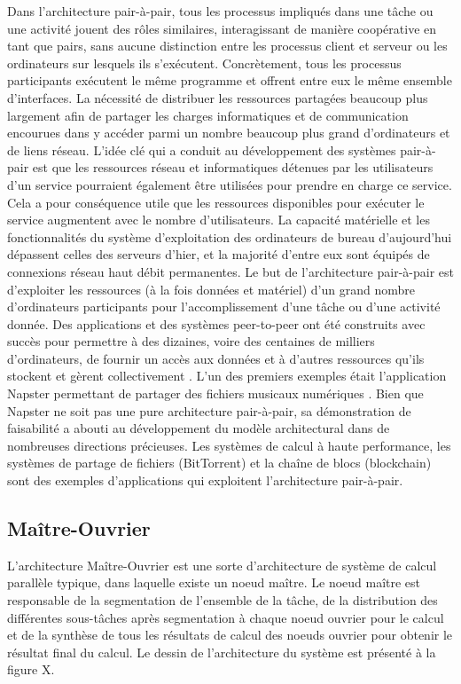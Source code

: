 Dans l'architecture pair-à-pair, tous les processus impliqués dans une tâche ou une activité jouent des rôles similaires, interagissant de manière coopérative en tant que pairs, sans aucune distinction entre les processus client et serveur ou les ordinateurs sur lesquels ils s'exécutent. Concrètement, tous les processus participants exécutent le même programme et offrent entre eux le même ensemble d'interfaces. La nécessité de distribuer les ressources partagées beaucoup plus largement afin de partager les charges informatiques et de communication encourues dans y accéder parmi un nombre beaucoup plus grand d'ordinateurs et de liens réseau. L'idée clé qui a conduit au développement des systèmes pair-à-pair est que les ressources réseau et informatiques détenues par les utilisateurs d'un service pourraient également être utilisées pour prendre en charge ce service. Cela a pour conséquence utile que les ressources disponibles pour exécuter le service augmentent avec le nombre d'utilisateurs. La capacité matérielle et les fonctionnalités du système d'exploitation des ordinateurs de bureau d'aujourd'hui dépassent celles des serveurs d'hier, et la majorité d'entre eux sont équipés de connexions réseau haut débit permanentes. Le but de l'architecture pair-à-pair est d'exploiter les ressources (à la fois données et matériel) d'un grand nombre d'ordinateurs participants pour l'accomplissement d'une tâche ou d'une activité donnée. Des applications et des systèmes peer-to-peer ont été construits avec succès pour permettre à des dizaines, voire des centaines de milliers d'ordinateurs, de fournir un accès aux données et à d'autres ressources qu'ils stockent et gèrent collectivement \cite{Coulouris_2012}. L'un des premiers exemples était l'application Napster permettant de partager des fichiers musicaux numériques \cite{Vu2010}. Bien que Napster ne soit pas une pure architecture pair-à-pair, sa démonstration de faisabilité a abouti au développement du modèle architectural dans de nombreuses directions précieuses. Les systèmes de calcul à haute performance, les systèmes de partage de ﬁchiers (BitTorrent) \cite{toole2006bittorrent} et la chaîne de blocs (blockchain) \cite{Abdella_2021} sont des exemples d'applications qui exploitent l'architecture pair-à-pair.

\subsection{Maître-Ouvrier}

L'architecture Maître-Ouvrier est une sorte d'architecture de système de calcul parallèle typique, dans laquelle existe un noeud maître. Le noeud maître est responsable de la segmentation de l'ensemble de la tâche, de la distribution des différentes sous-tâches après segmentation à chaque noeud ouvrier pour le calcul et de la synthèse de tous les résultats de calcul des noeuds ouvrier pour obtenir le résultat final du calcul. Le dessin de l'architecture du système est présenté à la figure X. \cite{LU2020106497}


